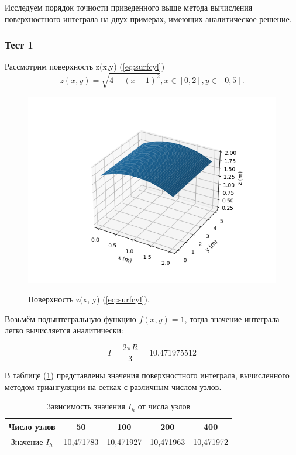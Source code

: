 \documentclass{article}
\begin{document}
Исследуем порядок точности приведенного выше метода вычисления поверхностного интеграла на двух примерах, имеющих аналитическое решение.

\subsubsection*{Тест 1}

Рассмотрим поверхность z(x,y) (\ref{eq:surfcyl}) %
\begin{equation}\label{eq:surfcyl}
z(x,y) = \sqrt{4-(x-1)^2}, x \in [0,2], y \in [0,5].
\end{equation}

\begin{figure}[H]
\centering
\includegraphics[width=0.8\linewidth]{cylinder.png}
\caption[]{}
\label{fig:cylinder}
Поверхность z(x, y) (\ref{eq:surfcyl}).	%
\end{figure}

Возьмём подынтегральную функцию $f(x,y) = 1$, тогда значение интеграла легко вычисляется аналитически:

\begin{equation}
I = \frac{2 \pi R}{3} = 10.471975512
\end{equation}

В таблице (\ref{table:cylinder}) представлены значения поверхностного интеграла, вычисленного методом триангуляции на сетках с различным числом узлов.

\begin{table}[ht]
\centering
\begin{tabular}{|c|c|c|c|c|}
\hline
 Число узлов	& 50		& 100		& 200		& 400		\\ 
\hline
 Значение $I_h$		& 10,471783	& 10,471927	& 10,471963	& 10,471972	\\  
\hline
\end{tabular}
\caption{Зависимость значения $I_h$ от числа узлов\label{table:cylinder}}
\end{table}
\end{document}
